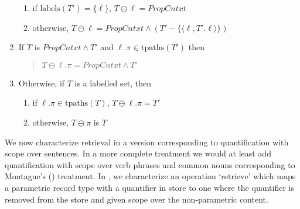 \begin{shaded}
\begin{ex}
\begin{enumerate}
\begin{enumerate}
  \item if $\mathrm{labels}(T')=\{\ell\}$, $T\ominus\ell=\textit{PropCntxt}$
    
  \item otherwise, $T\ominus\ell=\textit{PropCntxt}\wedge(T'-\{\langle\ell,T'.\ell\rangle\})$ 
    
  \end{enumerate} 

\item If $T$ is $\textit{PropCntxt}\wedge T'$ and
  $\ell.\pi\in\mathrm{tpaths}(T')$ then
  \begin{quote}
    $T\ominus\ell.\pi=\textit{PropCntxt}\wedge T'$\fbox{\d{$\wedge$}}
  \end{quote}

\item Otherwise, if $T$ is a labelled set, then
  \begin{enumerate}
  \item if $\ell.\pi\in\mathrm{tpaths}(T)$, $T\ominus\ell.\pi=T'$\fbox{\d{$\wedge$}}
  \item otherwise, $T\ominus\pi$ is $T$
  \end{enumerate}

  
 
\end{enumerate} 
\label{ex:ominus-with-qstore}   
\end{ex}

\end{shaded}

We now characterize retrieval in a version corresponding to
quantification with scope over sentences.  In a more complete
treatment we would at least add quantification with scope over verb phrases
and common nouns corresponding to Montague's (\citeyear{Montague1973})
treatment.  In \nexteg{}, we characterize an operation
`$\mathrm{retrieve}$' which maps a parametric record type with a
quantifier in store to one where the quantifier is removed from the
store and given scope over the non-parametric content.

